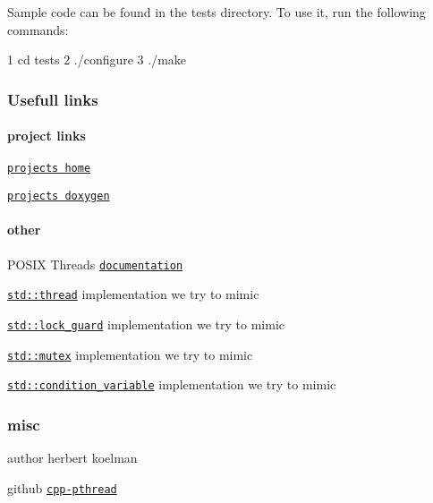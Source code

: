 Sample code can be found in the {\ttfamily tests} directory. To use it, run the following commands\+: 
\begin{DoxyCode}
1 cd tests
2 ./configure
3 ./make
\end{DoxyCode}


\subsubsection*{Usefull links}

\paragraph*{project links}


\begin{DoxyItemize}
\item \href{https://github.com/HerbertKoelman/cpp-pthread}{\tt project\textquotesingle{}s home}
\item \href{http://herbertkoelman.github.io/cpp-pthread/doc/html/}{\tt project\textquotesingle{}s doxygen}
\end{DoxyItemize}

\paragraph*{other}


\begin{DoxyItemize}
\item P\+O\+S\+I\+X Threads \href{http://pubs.opengroup.org/onlinepubs/007908799/xsh/threads.html}{\tt documentation}
\item \href{http://en.cppreference.com/w/cpp/thread/thread}{\tt std\+::thread} implementation we try to mimic
\item \href{http://en.cppreference.com/w/cpp/thread/lock_guard/lock_guard}{\tt std\+::lock\+\_\+guard} implementation we try to mimic
\item \href{http://en.cppreference.com/w/cpp/thread/mutex}{\tt std\+::mutex} implementation we try to mimic
\item \href{http://en.cppreference.com/w/cpp/thread/condition_variable}{\tt std\+::condition\+\_\+variable} implementation we try to mimic
\end{DoxyItemize}

\subsubsection*{misc}


\begin{DoxyItemize}
\item author herbert koelman
\item github \href{https://github.com/HerbertKoelman/cpp-pthread}{\tt cpp-\/pthread} 
\end{DoxyItemize}